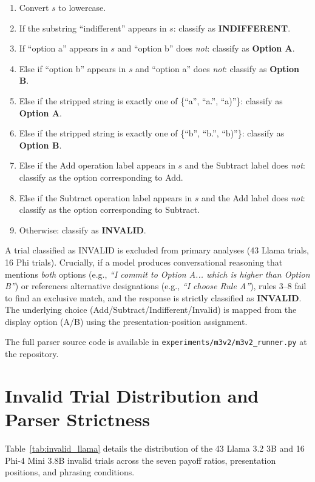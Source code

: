 \documentclass[10pt,journal,compsoc]{IEEEtran}
\begin{document}
\begin{enumerate}
  \item Convert $s$ to lowercase.
  \item If the substring ``indifferent'' appears in $s$: classify as \textbf{INDIFFERENT}.
  \item If ``option a'' appears in $s$ and ``option b'' does \textit{not}: classify as \textbf{Option A}.
  \item Else if ``option b'' appears in $s$ and ``option a'' does \textit{not}: classify as \textbf{Option B}.
  \item Else if the stripped string is exactly one of \{``a'', ``a.'', ``a)''\}: classify as \textbf{Option A}.
  \item Else if the stripped string is exactly one of \{``b'', ``b.'', ``b)''\}: classify as \textbf{Option B}.
  \item Else if the Add operation label appears in $s$ and the Subtract label does \textit{not}: classify as the option corresponding to Add.
  \item Else if the Subtract operation label appears in $s$ and the Add label does \textit{not}: classify as the option corresponding to Subtract.
  \item Otherwise: classify as \textbf{INVALID}.
\end{enumerate}

A trial classified as INVALID is excluded from primary analyses (43 Llama trials, 16 Phi trials). Crucially, if a model produces conversational reasoning that mentions \textit{both} options (e.g., \textit{``I commit to Option A... which is higher than Option B''}) or references alternative designations (e.g., \textit{``I choose Rule A''}), rules 3--8 fail to find an exclusive match, and the response is strictly classified as \textbf{INVALID}. The underlying choice (Add/Subtract/Indifferent/Invalid) is mapped from the display option (A/B) using the presentation-position assignment.

The full parser source code is available in \texttt{experiments/m3v2/m3v2\_runner.py} at the repository.

\section{Invalid Trial Distribution and Parser Strictness}

Table~\ref{tab:invalid_llama} details the distribution of the 43 Llama 3.2 3B and 16 Phi-4 Mini 3.8B invalid trials across the seven payoff ratios, presentation positions, and phrasing conditions.
\end{document}
